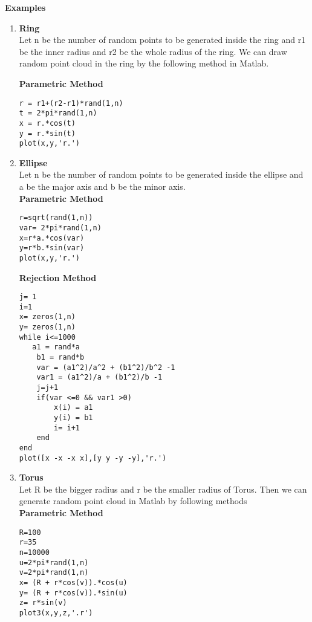 \documentclass[12pt]{article}
\begin{document}
\textbf{\large{ Examples}}\\

\begin{enumerate}

\item\textbf{ Ring}\\
Let n be the number of random points to be generated inside the ring and r1 be the inner radius and r2 be the whole radius of the ring. We can draw random point cloud in the ring by the following method in Matlab.


\textbf{Parametric Method}\\

\begin{verbatim}
r = r1+(r2-r1)*rand(1,n)
t = 2*pi*rand(1,n)
x = r.*cos(t)
y = r.*sin(t)
plot(x,y,'r.')
\end{verbatim}

\item\textbf{Ellipse}\\
Let n be the number of random points to be generated inside the ellipse and a be the major axis and b be the minor axis.\\
\textbf{Parametric Method}\\

\begin{verbatim}
r=sqrt(rand(1,n))
var= 2*pi*rand(1,n)
x=r*a.*cos(var)
y=r*b.*sin(var)
plot(x,y,'r.')
\end{verbatim}

\textbf{Rejection Method}\\

\begin{verbatim}
j= 1
i=1
x= zeros(1,n)
y= zeros(1,n)
while i<=1000
   a1 = rand*a
    b1 = rand*b
    var = (a1^2)/a^2 + (b1^2)/b^2 -1
    var1 = (a1^2)/a + (b1^2)/b -1
    j=j+1
    if(var <=0 && var1 >0)
        x(i) = a1
        y(i) = b1
        i= i+1
    end
end
plot([x -x -x x],[y y -y -y],'r.')
\end{verbatim}

\item\textbf{Torus}\\

Let R be the bigger radius and r be the smaller radius of Torus. Then we can generate random point cloud in Matlab by following methods\\
\textbf{Parametric Method}\\
\begin{verbatim}
R=100
r=35
n=10000
u=2*pi*rand(1,n)
v=2*pi*rand(1,n)
x= (R + r*cos(v)).*cos(u)
y= (R + r*cos(v)).*sin(u)
z= r*sin(v)
plot3(x,y,z,'.r')
\end{verbatim}


\end{enumerate}
\end{document}
